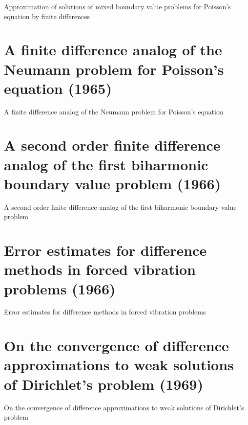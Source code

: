 Approximation of solutions of mixed boundary value problems for Poisson's equation by finite differences \cite{bramble1965approximation}



\section{A finite difference analog of the Neumann problem for Poisson's equation (1965)}
A finite difference analog of the Neumann problem for Poisson's equation \cite{bramble1965finite}



\section{A second order finite difference analog of the first biharmonic boundary value problem (1966)}
A second order finite difference analog of the first biharmonic boundary value problem \cite{bramble1966second}


\section{Error estimates for difference methods in forced vibration problems (1966)}
Error estimates for difference methods in forced vibration problems \cite{bramble1966error}


\section{On the convergence of difference approximations to weak solutions of Dirichlet's problem (1969)}
On the convergence of difference approximations to weak solutions of Dirichlet's problem \cite{bramble1969convergence}
